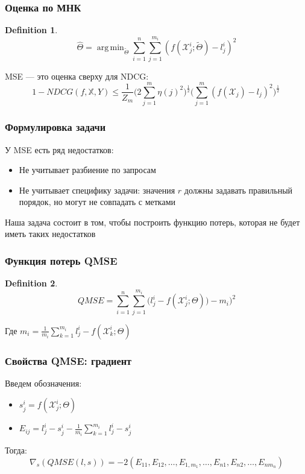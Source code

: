 \documentclass[unicode, notheorems]{beamer}
\DeclareMathOperator*{\argmin}{arg\,min}
\newtheorem{definition}{Definition}
\begin{document}
\begin{frame}
\frametitle{Оценка по МНК}

\begin{definition}
\begin{equation*}
\hat\Theta = \argmin_{\tilde\Theta}{\sum_{i=1}^n{\sum_{j=1}^{m_i}{(f(\mathcal X^i_j; \tilde\Theta) - l^i_j) ^ 2}}}
\end{equation*}
\end{definition}

MSE --- это оценка сверху для NDCG:
\begin{equation*}
1 - NDCG(f, \mathbb X, Y) \leq \frac{1}{Z_m}\Big( 2 \sum_{j=1}^{m}{\eta(j)^2}\Big)^{\frac{1}{2}} \Big( \sum_{j=1}^{m}{(f(\mathcal X_j) - l_j)^2}\Big)^{\frac{1}{2}}\,
\end{equation*}

\end{frame}

\begin{frame}
\frametitle{Формулировка задачи}

У MSE есть ряд недостатков:

\begin{itemize}
\item Не учитывает разбиение по запросам
\item Не учитывает специфику задачи: значения $r$ должны задавать правильный порядок, но могут не совпадать с метками
\end{itemize}

Наша задача состоит в том, чтобы  построить функцию потерь, которая не будет иметь таких недостатков

\end{frame}

\begin{frame}
\frametitle{Функция потерь QMSE}

\begin{definition}
\begin{equation*}
QMSE = \sum_{i=1}^{n}{\sum_{j=1}^{m_i}{\big(  l^i_j - f(\mathcal X^i_j; \Theta)) - m_i \big)^2}}
\end{equation*}
\end{definition}
Где $m_i = \frac{1}{m_i}\sum_{k=1}^{m_i}{l^i_j - f(\mathcal X^i_k; \Theta)}$

\end{frame}

\begin{frame}
\frametitle{Свойства QMSE: градиент}

Введем обозначения:
\begin{itemize}
\item $s^i_j  = f(\mathcal X^i_j; \Theta)$ 
\item $E_{ij} = l^i_j - s^i_j -  \frac{1}{m_i}\sum_{k=1}^{m_i}{l^i_j - s^i_j}$
\end{itemize}

Тогда:
\begin{equation*}
\nabla_s (QMSE(l, s)) = -2 (E_{11}, E_{12}, \ldots, E_{1,m_1}, \ldots, E_{n1}, E_{n2}, \ldots, E_{nm_n})
\end{equation*}

\end{frame}
\end{document}
